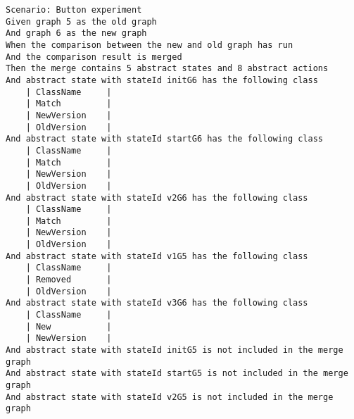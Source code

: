 \begin{lstlisting}[language=Gherkin,  basicstyle=\tiny, caption=Test Scenario's, label=code:gherkin-tests]
Scenario: Button experiment 
Given graph 5 as the old graph
And graph 6 as the new graph
When the comparison between the new and old graph has run
And the comparison result is merged
Then the merge contains 5 abstract states and 8 abstract actions
And abstract state with stateId initG6 has the following class
    | ClassName     |
    | Match         |
    | NewVersion    |
    | OldVersion    |
And abstract state with stateId startG6 has the following class
    | ClassName     |
    | Match         |
    | NewVersion    |
    | OldVersion    |
And abstract state with stateId v2G6 has the following class
    | ClassName     |
    | Match         |
    | NewVersion    |
    | OldVersion    |
And abstract state with stateId v1G5 has the following class
    | ClassName     |
    | Removed       |
    | OldVersion    |
And abstract state with stateId v3G6 has the following class
    | ClassName     |
    | New           |
    | NewVersion    |
And abstract state with stateId initG5 is not included in the merge graph
And abstract state with stateId startG5 is not included in the merge graph
And abstract state with stateId v2G5 is not included in the merge graph
\end{lstlisting}